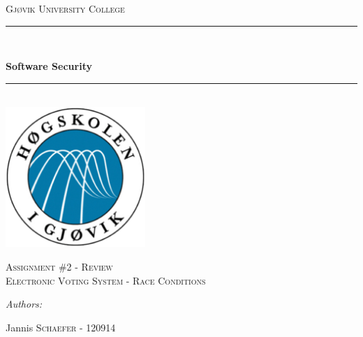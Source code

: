\documentclass[12pt]{article} %
\begin{document}

\begin{titlepage}

\newcommand{\HRule}{\rule{\linewidth}{0.5mm}} %

\center %
\begin{myfont}
\textsc{{\large Gjøvik University College}}\\[0.5cm] %
\end{myfont}
\HRule \\[0.4cm]

\begin{myfont}
{ \huge \bfseries Software Security}\\[0cm] %
\end{myfont}

\HRule \\[0.4cm]
\includegraphics[width=200px, height=200px]{logo}\\[0.8cm] %
\begin{myfont}
\textsc{\Large Assignment \#2 - Review}\\[0.5cm] %
\textsc{\large Electronic Voting System - Race Conditions}\\[0.5cm] %
\end{myfont}


\begin{minipage}{0.44\textwidth}
\begin{flushleft} \large
\emph{Authors:}\\
\begin{myfont}
Jannis \textsc{Schaefer} - 120914\\ %
\end{myfont}
\end{flushleft}


\end{minipage}
\end{titlepage}
\end{document}

